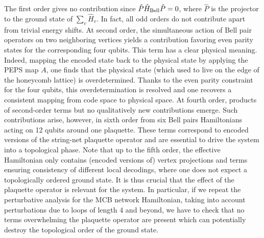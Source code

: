 \documentclass[twocolumn,floats,prx,showpacs]{revtex4-1}
\begin{document}
The first order gives no contribution since  $\hat P \hat H_{\rm Bell}\hat P=0$, where $\hat P$ is the projector to the ground state of $\sum_v \hat H_v$. In fact,
all odd orders do not contribute apart from trivial energy shifts.
At second order, the simultaneous action of Bell pair operators on two neighboring vertices yields a contribution favoring even parity states for the corresponding four qubits. This term has a clear physical meaning. 
Indeed, mapping the encoded state back to the physical state by applying the PEPS map $A$, one finds that the physical state (which used to live on the edge of the honeycomb lattice) is overdetermined. Thanks to the even parity constraint for the four qubits, this overdetermination is resolved and one recovers a consistent mapping from code space to physical space.  At fourth order, products of second-order terms but no  qualitatively new contributions emerge. Such contributions arise, however, 
in sixth order from six Bell pairs Hamiltonians acting on 12 qubits around one plaquette. These terms correspond to encoded versions of the string-net plaquette operator and are essential to drive the system into a topological phase. Note that up to the fifth order, the effective Hamiltonian only contains (encoded versions of) vertex projections and terms ensuring consistency of different local decodings, where one does not expect a topologically ordered ground state.
It is thus crucial that the effect of the plaquette operator is relevant for the system. In particular, if we repeat the perturbative analysis for the MCB network Hamiltonian, taking into account perturbations due to loops of length 4 and beyond, we have to check that no terms overwhelming the plaquette operator are present which can potentially destroy the topological order of the ground state.   
\end{document}
